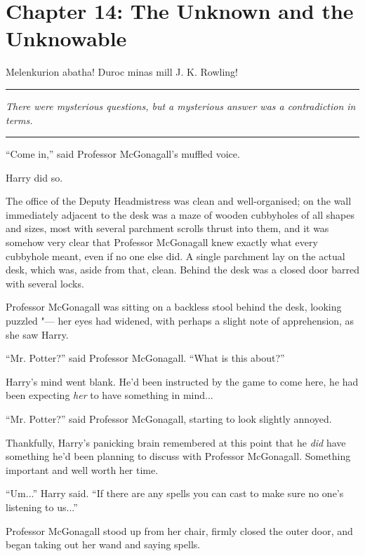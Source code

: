 \chapter{Chapter 14: The Unknown and the Unknowable}
Melenkurion abatha! Duroc minas mill J. K. Rowling!

\begin{center}\rule{3in}{0.4pt}\end{center}

\emph{There were mysterious questions, but a mysterious answer was a
contradiction in terms.}

\begin{center}\rule{3in}{0.4pt}\end{center}

``Come in,'' said Professor McGonagall's muffled voice.

Harry did so.

The office of the Deputy Headmistress was clean and well-organised; on
the wall immediately adjacent to the desk was a maze of wooden
cubbyholes of all shapes and sizes, most with several parchment scrolls
thrust into them, and it was somehow very clear that Professor
McGonagall knew exactly what every cubbyhole meant, even if no one else
did. A single parchment lay on the actual desk, which was, aside from
that, clean. Behind the desk was a closed door barred with several
locks.

Professor McGonagall was sitting on a backless stool behind the desk,
looking puzzled "--- her eyes had widened, with perhaps a slight note of
apprehension, as she saw Harry.

``Mr. Potter?'' said Professor McGonagall. ``What is this about?''

Harry's mind went blank. He'd been instructed by the game to come here,
he had been expecting \emph{her} to have something in mind...

``Mr. Potter?'' said Professor McGonagall, starting to look slightly
annoyed.

Thankfully, Harry's panicking brain remembered at this point that he
\emph{did} have something he'd been planning to discuss with Professor
McGonagall. Something important and well worth her time.

``Um...'' Harry said. ``If there are any spells you can cast to
make sure no one's listening to us...''

Professor McGonagall stood up from her chair, firmly closed the outer
door, and began taking out her wand and saying spells.

